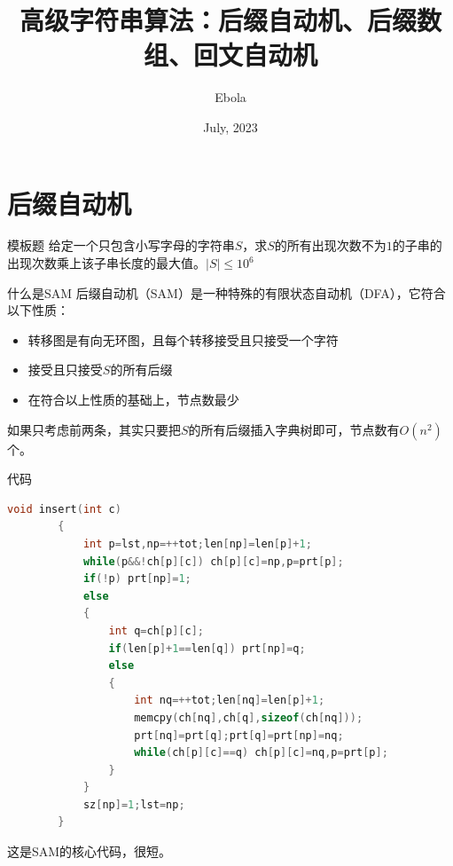 \documentclass{beamer}
\author{Ebola}
\title{高级字符串算法：后缀自动机、后缀数组、回文自动机}
\institute{
    Institute of Mathematics, \\
    Zhejiang University.
}
\date{July, 2023}
\begin{document}
\begin{frame}
    \titlepage
\end{frame}

\begin{frame}
    \tableofcontents[sectionstyle=show,subsectionstyle=show/shaded/hide,subsubsectionstyle=show/shaded/hide]
\end{frame}

\section{后缀自动机}

\begin{frame}{模板题}
    \small
    给定一个只包含小写字母的字符串$S$，求$S$的所有出现次数不为$1$的子串的出现次数乘上该子串长度的最大值。$|S|\leq 10^6$
\end{frame}

\begin{frame}{什么是SAM}
    \small
    后缀自动机（SAM）是一种特殊的有限状态自动机（DFA），它符合以下性质：

    \begin{itemize}
        \item 转移图是有向无环图，且每个转移接受且只接受一个字符
        \item 接受且只接受$S$的所有后缀
        \item 在符合以上性质的基础上，节点数最少
    \end{itemize}
    
    如果只考虑前两条，其实只要把$S$的所有后缀插入字典树即可，节点数有$O(n^2)$个。
\end{frame}

\begin{frame}[fragile]{代码}
    \begin{minipage}{\linewidth}
    \begin{lstlisting}[language=c++]
        void insert(int c)
        {
            int p=lst,np=++tot;len[np]=len[p]+1;
            while(p&&!ch[p][c]) ch[p][c]=np,p=prt[p];
            if(!p) prt[np]=1;
            else
            {
                int q=ch[p][c];
                if(len[p]+1==len[q]) prt[np]=q;
                else
                {
                    int nq=++tot;len[nq]=len[p]+1;
                    memcpy(ch[nq],ch[q],sizeof(ch[nq]));
                    prt[nq]=prt[q];prt[q]=prt[np]=nq;
                    while(ch[p][c]==q) ch[p][c]=nq,p=prt[p];
                }
            }
            sz[np]=1;lst=np;
        }
    \end{lstlisting}
    \end{minipage}

    这是SAM的核心代码，很短。
\end{frame}
\end{document}

